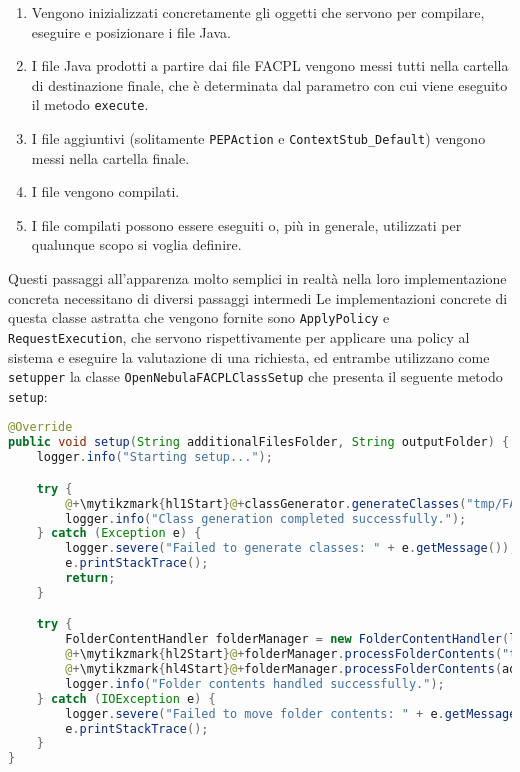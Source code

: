 \begin{enumerate}
    \item Vengono inizializzati concretamente gli oggetti che servono per compilare, eseguire e posizionare i file Java.
    \item I file Java prodotti a partire dai file FACPL vengono messi tutti nella cartella di destinazione finale, che è determinata dal parametro con cui viene eseguito il metodo \texttt{execute}.
    \item I file aggiuntivi (solitamente \texttt{PEPAction} e \texttt{ContextStub\_Default}) vengono messi nella cartella finale.
    \item I file vengono compilati.
    \item I file compilati possono essere eseguiti o, più in generale, utilizzati per qualunque scopo si voglia definire.
\end{enumerate}
Questi passaggi all'apparenza molto semplici in realtà nella loro implementazione concreta necessitano di diversi passaggi intermedi\medbreak
Le implementazioni concrete di questa classe astratta che vengono fornite sono \texttt{ApplyPolicy} e \texttt{RequestExecution}, che servono rispettivamente per applicare una policy al sistema e eseguire la valutazione di una richiesta, ed entrambe utilizzano come \texttt{setupper} la classe \texttt{OpenNebulaFACPLClassSetup} che presenta il seguente metodo \texttt{setup}:
\begin{lstlisting}[language=Java, caption=Metodo di setup per OpenNebula, label=code:setupper]
@Override
public void setup(String additionalFilesFolder, String outputFolder) {
    logger.info("Starting setup...");

    try {
        @+\mytikzmark{hl1Start}@+classGenerator.generateClasses("tmp/FACPLFiles");@+\mytikzmark{hl1End}@+
        logger.info("Class generation completed successfully.");
    } catch (Exception e) {
        logger.severe("Failed to generate classes: " + e.getMessage());
        e.printStackTrace();
        return;
    }

    try {
        FolderContentHandler folderManager = new FolderContentHandler(logger);
        @+\mytikzmark{hl2Start}@+folderManager.processFolderContents("tmp/FACPLFiles/",@+\mytikzmark{hl2End}@+ @+\mytikzmark{hl3Start}@+outputFolder, new MoveStrategy());@+\mytikzmark{hl3End}@+
        @+\mytikzmark{hl4Start}@+folderManager.processFolderContents(additionalFilesFolder,@+\mytikzmark{hl4End}@+ @+\mytikzmark{hl5Start}@+outputFolder, new CopyStrategy());@+\mytikzmark{hl5End}@+
        logger.info("Folder contents handled successfully.");
    } catch (IOException e) {
        logger.severe("Failed to move folder contents: " + e.getMessage());
        e.printStackTrace();
    }
}
\end{lstlisting}
